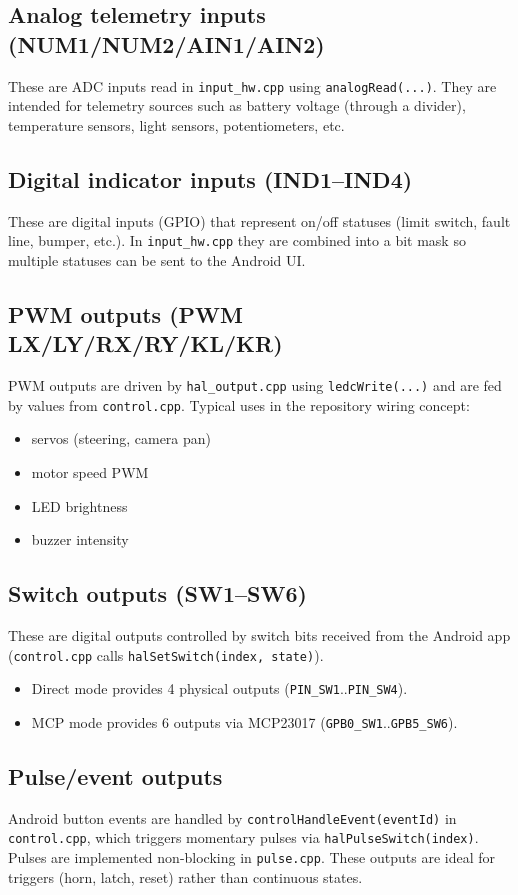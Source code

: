 \subsection{Analog telemetry inputs (NUM1/NUM2/AIN1/AIN2)}
These are ADC inputs read in \texttt{input\_hw.cpp} using \texttt{analogRead(...)}.
They are intended for telemetry sources such as battery voltage (through a divider), temperature sensors, light sensors,
potentiometers, etc.

\subsection{Digital indicator inputs (IND1--IND4)}
These are digital inputs (GPIO) that represent on/off statuses (limit switch, fault line, bumper, etc.).
In \texttt{input\_hw.cpp} they are combined into a bit mask so multiple statuses can be sent to the Android UI.

\subsection{PWM outputs (PWM LX/LY/RX/RY/KL/KR)}
PWM outputs are driven by \texttt{hal\_output.cpp} using \texttt{ledcWrite(...)} and are fed by values from
\texttt{control.cpp}.
Typical uses in the repository wiring concept:
\begin{itemize}
    \item servos (steering, camera pan)
    \item motor speed PWM
    \item LED brightness
    \item buzzer intensity
\end{itemize}

\subsection{Switch outputs (SW1--SW6)}
These are digital outputs controlled by switch bits received from the Android app (\texttt{control.cpp} calls
\texttt{halSetSwitch(index, state)}).
\begin{itemize}
    \item Direct mode provides 4 physical outputs (\texttt{PIN\_SW1}..\texttt{PIN\_SW4}).
    \item MCP mode provides 6 outputs via MCP23017 (\texttt{GPB0\_SW1}..\texttt{GPB5\_SW6}).
\end{itemize}

\subsection{Pulse/event outputs}
Android button events are handled by \texttt{controlHandleEvent(eventId)} in \texttt{control.cpp}, which triggers
momentary pulses via \texttt{halPulseSwitch(index)}. Pulses are implemented non-blocking in \texttt{pulse.cpp}.
These outputs are ideal for triggers (horn, latch, reset) rather than continuous states.

